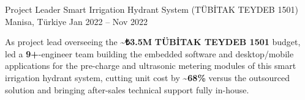 \begin{cventries}
  \cventry
    {Project Leader} %
    {Smart Irrigation Hydrant System (TÜBİTAK TEYDEB 1501)} %
    {Manisa, Türkiye} %
    {Jan 2022 – Nov 2022} %
    {
      \begin{cvitems} %
        \item {As project lead overseeing the \textbf{\textasciitilde₺3.5M} \textbf{TÜBİTAK TEYDEB 1501} budget, led a \textbf{9+}-engineer team building the embedded software and desktop/mobile applications for the pre-charge and ultrasonic metering modules of this smart irrigation hydrant system, cutting unit cost by \textbf{\textasciitilde68\%} versus the outsourced solution and bringing after-sales technical support fully in-house.}
      \end{cvitems}
    }

\end{cventries}
